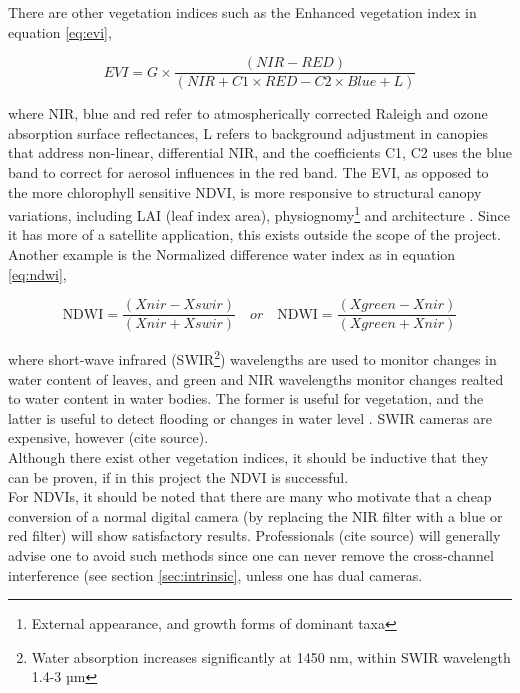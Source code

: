 There are other vegetation indices such as the Enhanced vegetation index in equation \ref{eq:evi},

\begin{equation}\label{eq:evi}
EVI=G\times {\frac  {(NIR-RED)}{(NIR+C1\times RED-C2\times Blue+L)}}
\end{equation}

where NIR, blue and red refer to atmospherically corrected Raleigh and ozone absorption surface reflectances, L refers to background adjustment in canopies that address non-linear, differential NIR, and the coefficients C1, C2 uses the blue band to correct for aerosol influences in the red band. The EVI, as opposed to the more chlorophyll sensitive NDVI, is more responsive to structural canopy variations, including LAI (leaf index area), physiognomy\footnote{External appearance, and growth forms of dominant taxa} and architecture \cite{evi}. Since it has more of a satellite application, this exists outside the scope of the project.\\

Another example is the Normalized difference water index as in equation \ref{eq:ndwi},

\begin{equation}\label{eq:ndwi}
{\displaystyle {\mbox{NDWI}}={\frac {(Xnir-Xswir)}{(Xnir+Xswir)}}}\quad or\quad {\displaystyle {\mbox{NDWI}}={\frac {(Xgreen-Xnir)}{(Xgreen+Xnir)}}}
\end{equation}

where short-wave infrared (SWIR\footnote{Water absorption increases significantly at 1450 nm, within SWIR wavelength 1.4-3 µm}) wavelengths are used to monitor changes in water content of leaves, and green and NIR wavelengths monitor changes realted to water content in water bodies. The former is useful for vegetation, and the latter is useful to detect flooding or changes in water level \cite{ndwi}. SWIR cameras are expensive, however (cite source).\\

Although there exist other vegetation indices, it should be inductive that they can be proven, if in this project the NDVI is successful.\\

For NDVIs, it should be noted that there are many who motivate that a cheap conversion of a normal digital camera (by replacing the NIR filter with a blue or red filter) will show satisfactory results. Professionals (cite source) will generally advise one  to avoid such methods since one can never remove the cross-channel interference (see section \ref{sec:intrinsic}, unless one has dual cameras.\\

